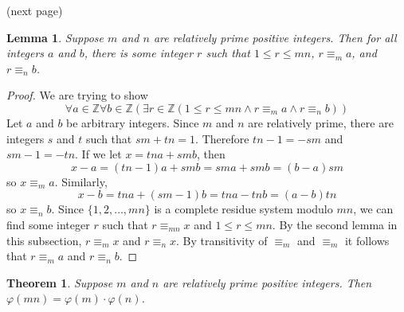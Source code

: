 \documentclass{report}
\newtheorem*{theorem}{Theorem}
\newtheorem*{lemma}{Lemma}
\theoremstyle{definition}
\begin{document}
\noindent(next page)\newpage
\begin{lemma}
Suppose $m$ and $n$ are relatively prime positive integers. Then for all integers $a$ and $b$, there is some integer $r$ such that $1\leq r\leq mn$,
$r\equiv_ma$, and $r\equiv_nb$.
\end{lemma}
\begin{proof}
We are trying to show 
\begin{equation*}
\forall a\in\mathbb Z\forall b\in\mathbb Z(\exists r\in\mathbb Z(1\leq r\leq mn\land r\equiv_ma\land r\equiv_nb))
\end{equation*}
Let $a$ and $b$ be arbitrary integers. Since $m$ and $n$ are relatively prime, there are integers $s$ and $t$ such that $sm+tn=1$. Therefore $tn-1=-sm$ and $sm-1=-tn$. If we let $x=tna+smb$, then
\begin{equation*}
x-a=(tn-1)a+smb=sma+smb=(b-a)sm
\end{equation*}
so $x\equiv_ma$. Similarly,
\begin{equation*}
x-b=tna+(sm-1)b=tna-tnb=(a-b)tn
\end{equation*}
so $x\equiv_nb$. Since $\{1,2,\ldots,mn\}$ is a complete residue system modulo $mn$, we can find some integer $r$ such that 
$r\equiv_{mn}x$ and $1\leq r\leq mn$. By the second lemma in this subsection, $r\equiv_mx$ and $r\equiv_nx$. By transitivity of $\equiv_m$ and 
$\equiv_m$ it follows that $r\equiv_ma$ and $r\equiv_nb$.
\end{proof}
\begin{theorem}
Suppose $m$ and $n$ are relatively prime positive integers. Then\\$\varphi(mn)=\varphi(m)\cdot\varphi(n)$.
\end{theorem}
\end{document}
